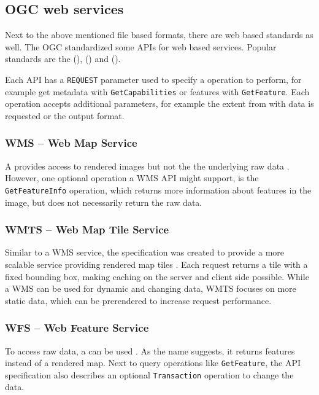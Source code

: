 	\subsection{OGC web services}
	
		Next to the above mentioned file based formats, there are web based standards as well.
		The OGC standardized some APIs for web based services.
		Popular standards are the  (),  () and  ().
		
		Each API has a \texttt{REQUEST} parameter used to specify a operation to perform, for example get metadata with \texttt{GetCapabilities} or features with \texttt{GetFeature}.
		Each operation accepts additional parameters, for example the extent from with data is requested or the output format.
		
		\subsubsection{WMS -- Web Map Service}
		
			A  provides access to rendered images but not the the underlying raw data \cite{ogc-wms}.
			However, one optional operation a WMS API might support, is the \texttt{GetFeatureInfo} operation, which returns more information about features in the image, but does not necessarily return the raw data.
		
		\subsubsection{WMTS -- Web Map Tile Service}
		
			Similar to a WMS service, the  specification was created to provide a more scalable service providing rendered map tiles \cite{ogc-wmts}.
			Each request returns a tile with a fixed bounding box, making caching on the server and client side possible.
			While a WMS can be used for dynamic and changing data, WMTS focuses on more static data, which can be prerendered to increase request performance.
		
		\subsubsection{WFS -- Web Feature Service}
		
			To access raw data, a  can be used \cite{ogc-wfs}.
			As the name suggests, it returns features instead of a rendered map.
			Next to query operations like \texttt{GetFeature}, the API specification also describes an optional \texttt{Transaction} operation to change the data.
	
